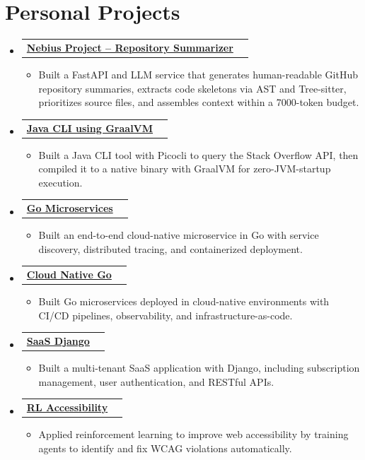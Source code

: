 \documentclass[letterpaper,11pt]{article}
\makeatletter
\newcommand{\resumeItem}[1]{
  \item\small{
    {#1 \vspace{-3pt}}
  }
}
\newcommand{\resumeProjectHeading}[2]{
  \vspace{-3pt}\item
    \begin{tabular*}{1.0\textwidth}[t]{l@{\extracolsep{\fill}}r}
      \textbf{#1} & \textbf{\small #2} \\
    \end{tabular*}\vspace{-7pt}
}
\newcommand{\resumeSubHeadingListStart}{\begin{itemize}[leftmargin=0.0in, label={}]}
\newcommand{\resumeSubHeadingListEnd}{\end{itemize}}
\newcommand{\resumeItemListStart}{\begin{itemize}}
\newcommand{\resumeItemListEnd}{\end{itemize}\vspace{0pt}}
\makeatother
\begin{document}
\section{Personal Projects}
\resumeSubHeadingListStart
    \resumeProjectHeading
      {\href{https://github.com/aymanapatel/nebius-project}{Nebius Project -- Repository Summarizer}}{}
      \resumeItemListStart
        \resumeItem{Built a FastAPI and LLM service that generates human-readable GitHub repository summaries, extracts code skeletons via AST and Tree-sitter, prioritizes source files, and assembles context within a 7000-token budget.}
      \resumeItemListEnd
    \resumeProjectHeading
      {\href{https://github.com/aymanapatel/java-cli}{Java CLI using GraalVM}}{}
      \resumeItemListStart
        \resumeItem{Built a Java CLI tool with Picocli to query the Stack Overflow API, then compiled it to a native binary with GraalVM for zero-JVM-startup execution.}
      \resumeItemListEnd
    \resumeProjectHeading
      {\href{https://github.com/aymanapatel/golang-microservices}{Go Microservices}}{}
      \resumeItemListStart
        \resumeItem{Built an end-to-end cloud-native microservice in Go with service discovery, distributed tracing, and containerized deployment.}
      \resumeItemListEnd
    \resumeProjectHeading
      {\href{https://github.com/aymanapatel/cloud-native-go}{Cloud Native Go}}{}
      \resumeItemListStart
        \resumeItem{Built Go microservices deployed in cloud-native environments with CI/CD pipelines, observability, and infrastructure-as-code.}
      \resumeItemListEnd
    \resumeProjectHeading
      {\href{https://github.com/aymanapatel/saas_django}{SaaS Django}}{}
      \resumeItemListStart
        \resumeItem{Built a multi-tenant SaaS application with Django, including subscription management, user authentication, and RESTful APIs.}
      \resumeItemListEnd
    \resumeProjectHeading
      {\href{https://github.com/aymanapatel/rl-a11y}{RL Accessibility}}{}
      \resumeItemListStart
        \resumeItem{Applied reinforcement learning to improve web accessibility by training agents to identify and fix WCAG violations automatically.}
      \resumeItemListEnd
\resumeSubHeadingListEnd
\end{document}
